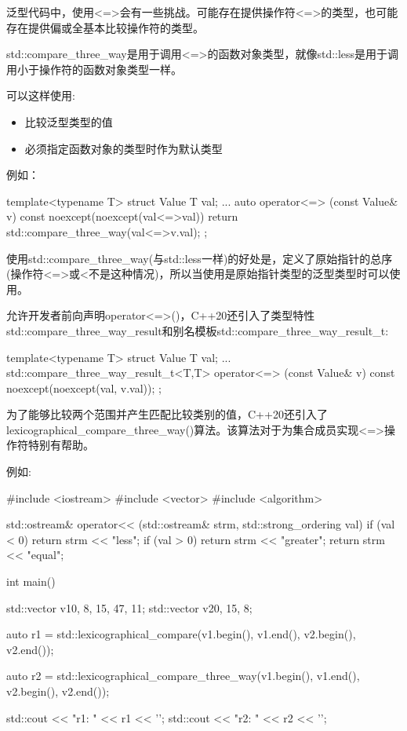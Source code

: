 
泛型代码中，使用<=>会有一些挑战。可能存在提供操作符<=>的类型，也可能存在提供偏或全基本比较操作符的类型。


std::compare\_three\_way是用于调用<=>的函数对象类型，就像std::less是用于调用小于操作符的函数对象类型一样。

可以这样使用:

\begin{itemize}
\item
比较泛型类型的值

\item
必须指定函数对象的类型时作为默认类型
\end{itemize}

例如：

\begin{cpp}
template<typename T>
struct Value {
	T val{};
	...
	auto operator<=> (const Value& v) const noexcept(noexcept(val<=>val)) {
		return std::compare_three_way{}(val<=>v.val);
	}
};
\end{cpp}

使用std::compare\_three\_way(与std::less一样)的好处是，定义了原始指针的总序(操作符<=>或<不是这种情况)，所以当使用是原始指针类型的泛型类型时可以使用。

允许开发者前向声明operator<=>()，C++20还引入了类型特性std::compare\_three\_way\_result和别名模板std::compare\_three\_way\_result\_t:

\begin{cpp}
template<typename T>
struct Value {
	T val{};
	...
	std::compare_three_way_result_t<T,T>
		operator<=> (const Value& v) const noexcept(noexcept(val, v.val));
};
\end{cpp}


为了能够比较两个范围并产生匹配比较类别的值，C++20还引入了lexicographical\_compare\_three\_way()算法。该算法对于为集合成员实现<=>操作符特别有帮助。

例如:


\begin{cpp}
#include <iostream>
#include <vector>
#include <algorithm>

std::ostream& operator<< (std::ostream& strm, std::strong_ordering val)
{
	if (val < 0) return strm << "less";
	if (val > 0) return strm << "greater";
	return strm << "equal";
}

int main()
{
	std::vector v1{0, 8, 15, 47, 11};
	std::vector v2{0, 15, 8};

	auto r1 = std::lexicographical_compare(v1.begin(), v1.end(),
										   v2.begin(), v2.end());

	auto r2 = std::lexicographical_compare_three_way(v1.begin(), v1.end(),
													 v2.begin(), v2.end());

	std::cout << "r1: " << r1 << '\n';
	std::cout << "r2: " << r2 << '\n';
}
\end{cpp}

